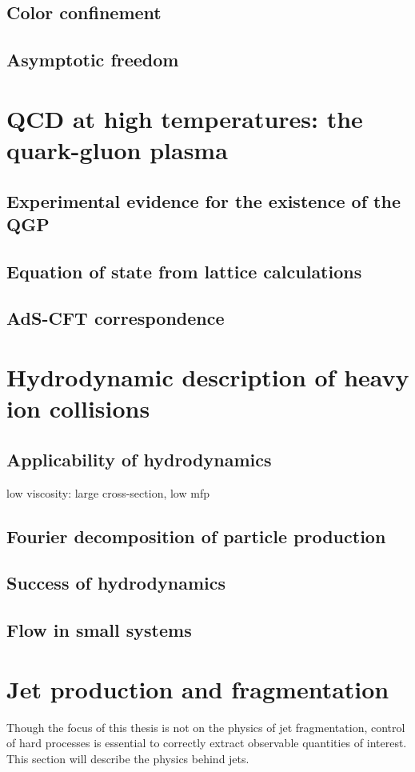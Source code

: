 \subsection{Color confinement}
\subsection{Asymptotic freedom}

\section{QCD at high temperatures: the quark-gluon plasma}
\subsection{Experimental evidence for the existence of the QGP}
\subsection{Equation of state from lattice calculations}
\subsection{AdS-CFT correspondence}

\section{Hydrodynamic description of heavy ion collisions}
\subsection{Applicability of hydrodynamics}
low viscosity: large cross-section, low mfp
\subsection{Fourier decomposition of particle production}
\subsection{Success of hydrodynamics}
\subsection{Flow in small systems}

\section{Jet production and fragmentation}
Though the focus of this thesis is not on the physics of jet fragmentation, control of hard processes is essential to correctly extract observable quantities of interest.
This section will describe the physics behind jets.

